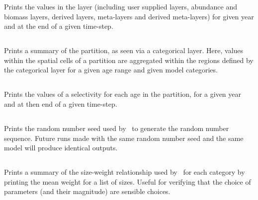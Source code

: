 Prints the values in the layer (including user supplied layers, abundance and biomass layers, derived layers, meta-layers and derived meta-layers) for given year and at the end of a given time-step. 

\subsection{}

Prints a summary of the partition, as seen via a categorical layer. Here, values within the spatial cells of a partition are aggregated within the regions defined by the categorical layer for a given age range and given model categories.

\subsection{}

Prints the values of a selectivity for each age in the partition, for a given year and at then end of a given time-step.

\subsection{}

Prints the random number seed used by \SPM\ to generate the random number sequence. Future runs made with the same random number seed and the same model will produce identical outputs.

\subsection{\label{sec:report-size-weight}}

Prints a summary of the size-weight relationship used by \SPM\ for each category by printing the mean weight for a list of sizes. Useful for verifying that the choice of parameters (and their magnitude) are sensible choices.

\subsection{\label{sec:report-age-size}}

